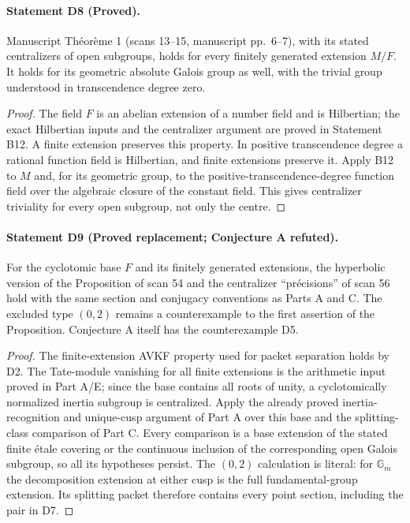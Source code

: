 \paragraph{Statement D8 (Proved).}\label{res:D8}
Manuscript Th\'eor\`eme 1 (scans 13--15, manuscript pp.~6--7), with its stated
centralizers of open subgroups, holds for every finitely generated
extension $M/F$.  It holds for its geometric absolute Galois group as
well, with the trivial group understood in transcendence degree zero.

\begin{proof}
The field $F$ is an abelian extension of a number field and is Hilbertian;
the exact Hilbertian inputs and the centralizer argument are proved in
Statement B12.  A finite extension preserves this property.  In positive
transcendence degree a rational function field is Hilbertian, and finite
extensions preserve it.  Apply B12 to $M$ and, for its geometric group,
to the positive-transcendence-degree function field over the algebraic
closure of the constant field.  This gives centralizer triviality for
every open subgroup, not only the centre.
\end{proof}

\paragraph{Statement D9 (Proved replacement; Conjecture A refuted).}\label{res:D9}
For the cyclotomic base $F$ and its finitely generated extensions, the
hyperbolic version of the Proposition of scan 54 and the centralizer
``pr\'ecisions'' of scan 56 hold with the same section and conjugacy
conventions as Parts A and C.  The excluded type $(0,2)$ remains a
counterexample to the first assertion of the Proposition.  Conjecture A
itself has the counterexample D5.

\begin{proof}
The finite-extension AVKF property used for packet separation holds by
D2.  The Tate-module vanishing for all finite extensions is the
arithmetic input proved in Part A/E; since the base contains all roots
of unity, a cyclotomically normalized inertia subgroup is centralized.
Apply the already proved inertia-recognition and unique-cusp argument
of Part A over this base and the splitting-class comparison of Part C.
Every comparison is a base extension of the stated finite \'etale
covering or the continuous inclusion of the corresponding open Galois
subgroup, so all its hypotheses persist.  The $(0,2)$ calculation is
literal: for $\mathbb G_m$ the decomposition extension at either cusp
is the full fundamental-group extension.  Its splitting packet
therefore contains every point section, including the pair in D7.
\end{proof}

